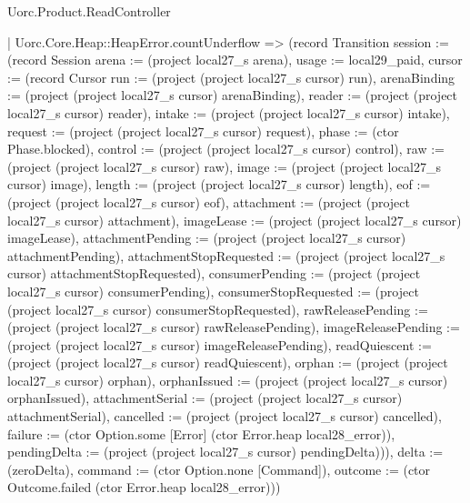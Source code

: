 \begin{lexlean}{Uorc.Product.ReadController}
\begin{semanticmodule}
{    | Uorc.Core.Heap::HeapError.countUnderflow => (record Transition {session := (record Session {arena := (project local27_s arena), usage := local29_paid, cursor := (record Cursor {run := (project (project local27_s cursor) run), arenaBinding := (project (project local27_s cursor) arenaBinding), reader := (project (project local27_s cursor) reader), intake := (project (project local27_s cursor) intake), request := (project (project local27_s cursor) request), phase := (ctor Phase.blocked), control := (project (project local27_s cursor) control), raw := (project (project local27_s cursor) raw), image := (project (project local27_s cursor) image), length := (project (project local27_s cursor) length), eof := (project (project local27_s cursor) eof), attachment := (project (project local27_s cursor) attachment), imageLease := (project (project local27_s cursor) imageLease), attachmentPending := (project (project local27_s cursor) attachmentPending), attachmentStopRequested := (project (project local27_s cursor) attachmentStopRequested), consumerPending := (project (project local27_s cursor) consumerPending), consumerStopRequested := (project (project local27_s cursor) consumerStopRequested), rawReleasePending := (project (project local27_s cursor) rawReleasePending), imageReleasePending := (project (project local27_s cursor) imageReleasePending), readQuiescent := (project (project local27_s cursor) readQuiescent), orphan := (project (project local27_s cursor) orphan), orphanIssued := (project (project local27_s cursor) orphanIssued), attachmentSerial := (project (project local27_s cursor) attachmentSerial), cancelled := (project (project local27_s cursor) cancelled), failure := (ctor Option.some [Error] (ctor Error.heap local28_error)), pendingDelta := (project (project local27_s cursor) pendingDelta)})}), delta := (zeroDelta), command := (ctor Option.none [Command]), outcome := (ctor Outcome.failed (ctor Error.heap local28_error))})
}
\end{semanticmodule}
\end{lexlean}
